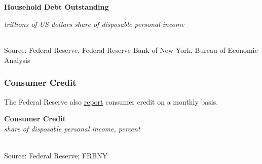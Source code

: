 \documentclass{report}
\makeatletter
\newcommand{\tbllink}[1]{\href{https://raw.githubusercontent.com/bdecon/US-chartbook/master/chartbook/data/#1}{\faTable}}
\newcommand*\short[1]{\expandafter\@gobbletwo\number\numexpr#1\relax}
\newcommand{\absnode}[3]{\node[below right, align=left] at (axis cs: #1,#2) {#3};}
\newcommand{\dateaxisticks}{
		date coordinates in=x, axis line style={draw=none},
		xmax={2022-03-15},
		max space between ticks=40,	    
		xtick={{1990-01-01}, {1992-01-01}, {1994-01-01}, 
			{1996-01-01}, {1998-01-01}, {2000-01-01}, 
			{2002-01-01}, {2004-01-01}, {2006-01-01},
			{2008-01-01}, {2010-01-01}, {2012-01-01}, {2014-01-01},
		    {2016-01-01}, {2018-01-01}, {2020-01-01}, {2022-01-01}, 
		    {2024-01-01}, {2026-01-01}},
		minor xtick={{1989-01-01}, {1991-01-01}, {1993-01-01},
			{1995-01-01}, {1997-01-01}, {1999-01-01}, 
			{2001-01-01}, {2003-01-01}, {2005-01-01}, {2007-01-01},
		    {2009-01-01}, {2011-01-01}, {2013-01-01}, {2015-01-01},
		    {2017-01-01}, {2019-01-01}, {2021-01-01}, {2023-01-01}, 
		    {2025-01-01}, {2027-01-01}},
		enlarge y limits={0.06}, enlarge x limits={0.01},
		}
\newcommand{\bbar}[2]{extra #1 ticks = {{#2}}, extra #1 tick labels = ,
		extra #1 tick style = {grid=major, grid style={thick, black!25}},}
\newcommand{\thinline}[4]{\addplot[no markers, color=#1] 
		table [x=#2, y=#3, col sep=comma] {#4};	}
\newcommand{\thickline}[4]{\addplot[ultra thick, no markers, color=#1] 
		table [x=#2, y=#3, col sep=comma] {#4};	}
\newcommand{\rbars}{
		\fill[color=black!10] (axis cs:{1990-07-01},\pgfkeysvalueof{/pgfplots/ymin}) rectangle 
			(axis cs:{1991-03-01}, \pgfkeysvalueof{/pgfplots/ymax});
		\fill[color=black!10] (axis cs:{2007-12-01},\pgfkeysvalueof{/pgfplots/ymin}) rectangle 
			(axis cs:{2009-07-01}, \pgfkeysvalueof{/pgfplots/ymax});
		\fill[color=black!10] (axis cs:{2001-03-01},\pgfkeysvalueof{/pgfplots/ymin}) rectangle 
			(axis cs:{2001-11-01}, \pgfkeysvalueof{/pgfplots/ymax});
		\fill[color=black!10] (axis cs:{2020-02-01},\pgfkeysvalueof{/pgfplots/ymin}) rectangle 
			(axis cs:{2020-05-01}, \pgfkeysvalueof{/pgfplots/ymax});}
\makeatother
\begin{document}
{\begin{minipage}{0.76\textwidth}
 

 
\vspace{1mm}

\normalsize \textbf{Household Debt Outstanding}\\
\footnotesize{\textit{trillions of US dollars \hspace{46mm} share of disposable personal income}\\
 \setlength{\tabcolsep}{3.1pt} \color{black!90}
	{\renewcommand{\arraystretch}{1.54}
		 \begin{tabular}{p{36mm} R{11.8mm} R{11.8mm}  R{8.0mm} R{7.4mm} R{7.4mm} 
		   R{7.4mm} R{7.4mm}}
			  \hline
		\end{tabular}
	}}\vspace{-1mm}

\footnotesize{Source: Federal Reserve, Federal Reserve Bank of New York, Bureau of Economic Analysis}
\end{minipage}
\newpage
\begin{minipage}{0.76\textwidth}
\subsubsection*{Consumer Credit}

\small The Federal Reserve also \href{https://www.federalreserve.gov/releases/g19/current/default.htm}{report} consumer credit on a monthly basis. 


\vspace{1mm}

\normalsize \textbf{Consumer Credit}\\
\footnotesize{\textit{share of disposable personal income, percent}}\\
\hspace*{-2mm} \\
\footnotesize{Source: Federal Reserve; FRBNY} \hfill \tbllink{cc_dpi_monthly.csv} \tbllink{hhcdebt.csv}
\end{minipage}
\vspace{5mm}

}
\end{document}
